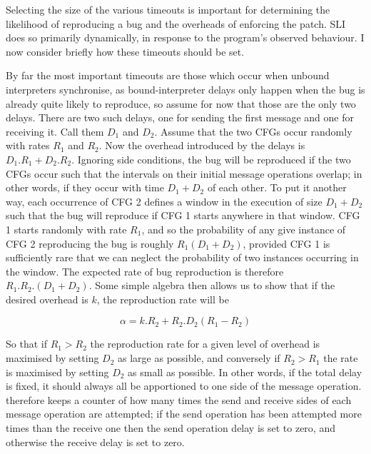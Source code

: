 Selecting the size of the various timeouts is important for
determining the likelihood of reproducing a bug and the overheads of
enforcing the patch.  SLI does so primarily dynamically, in response
to the program's observed behaviour.  I now consider briefly how these
timeouts should be set.

By far the most important timeouts are those which occur when unbound
interpreters synchronise, as bound-interpreter delays only happen when
the bug is already quite likely to reproduce, so
assume for now that those are the only two delays.  There are two such
delays, one for sending the first message and one for receiving it.
Call them $D_1$ and $D_2$.  Assume that the two CFGs occur randomly
with rates $R_1$ and $R_2$.  Now the overhead introduced by the delays
is $D_1.R_1 + D_2.R_2$.  Ignoring side conditions, the bug will be
reproduced if the two CFGs occur such that the intervals on their
initial message operations overlap; in other words, if they occur with
time $D_1 + D_2$ of each other.  To put it another way, each
occurrence of CFG 2 defines a window in the execution of size $D_1 +
D_2$ such that the bug will reproduce if CFG 1 starts anywhere in that
window.  CFG 1 starts randomly with rate $R_1$, and so the probability
of any give instance of CFG 2 reproducing the bug is roughly $R_1(D_1
+ D_2)$, provided CFG 1 is sufficiently rare that we can neglect the
probability of two instances occurring in the window.  The expected
rate of bug reproduction is therefore $R_1.R_2.(D_1+D_2)$.  Some
simple algebra then allows us to show that if the desired overhead is
$k$, the reproduction rate will be

\begin{displaymath}
\alpha = k.R_2 + R_2.D_2(R_1 - R_2)
\end{displaymath}

So that if $R_1 > R_2$ the reproduction rate for a given level of
overhead is maximised by setting $D_2$ as large as possible, and
conversely if $R_2 > R_1$ the rate is maximised by setting $D_2$ as
small as possible.  In other words, if the total delay is fixed, it
should always all be apportioned to one side of the message operation.
{\Technique} therefore keeps a counter of how many times the send and
receive sides of each message operation are attempted; if the send
operation has been attempted more times than the receive one then the
send operation delay is set to zero, and otherwise the receive delay
is set to zero.



